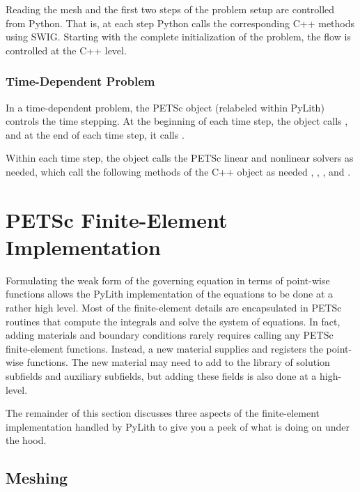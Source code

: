 Reading the mesh and the first two steps of the problem setup are
controlled from Python. That is, at each step Python calls the
corresponding C++ methods using SWIG. Starting with the complete
initialization of the problem, the flow is controlled at the C++
level.

\subsubsection{Time-Dependent Problem}

In a time-dependent problem, the PETSc  object (relabeled
 within PyLith) controls the time stepping. At the
beginning of each time step, the  object calls
, and at the end of each
time step, it calls .

Within each time step, the  object calls the PETSc
linear and nonlinear solvers as needed, which call the following
methods of the C++  object as
needed
,
,
, and
.

\section{PETSc Finite-Element Implementation}

Formulating the weak form of the governing equation in terms of
point-wise functions allows the PyLith implementation of the equations
to be done at a rather high level. Most of the finite-element details
are encapsulated in PETSc routines that compute the integrals and
solve the system of equations. In fact, adding materials and boundary
conditions rarely requires calling any PETSc finite-element
functions. Instead, a new material supplies and registers the
point-wise functions. The new material may need to add to the library
of solution subfields and auxiliary subfields, but adding these fields
is also done at a high-level.

The remainder of this section discusses three aspects of the
finite-element implementation handled by PyLith to give you a peek of
what is doing on under the hood.

\subsection{Meshing}

